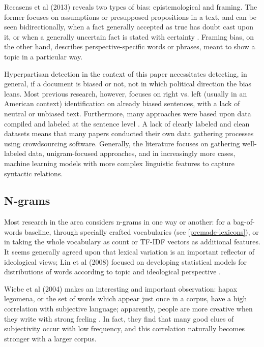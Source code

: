 \documentclass[11pt, a4paper]{article}
\begin{document}
Recasens et al (2013) reveals two types of bias: epistemological and framing. The former focuses on assumptions or presupposed propositions in a text, and can be seen bidirectionally, when a fact generally accepted as true has doubt cast upon it, or when a generally uncertain fact is stated with certainty \cite{recasens2013linguistic}. Framing bias, on the other hand, describes perspective-specific words or phrases, meant to show a topic in a particular way.

Hyperpartisan detection in the context of this paper necessitates detecting, in general, if a document is biased or not, not in which political direction the bias leans. Most previous research, however, focuses on right vs. left (usually in an American context) identification on already biased sentences, with a lack of neutral or unbiased text. Furthermore, many approaches were based upon data compiled and labeled at the sentence level \cite{conrad2012recognizing} \cite{somasundaran2010recognizing}. A lack of clearly labeled and clean datasets means that many papers conducted their own data gathering processes using crowdsourcing software. Generally, the literature focuses on gathering well-labeled data, unigram-focused approaches, and in increasingly more cases, machine learning models with more complex linguistic features to capture syntactic relations.

\subsection{N-grams} \label{ngrams}

Most research in the area considers n-grams in one way or another: for a bag-of-words baseline, through specially crafted vocabularies (see \ref{premade-lexicons}), or in taking the whole vocabulary as count or TF-IDF vectors as additional features. It seems generally agreed upon that lexical variation is an important reflector of ideological views; Lin et al (2008) focused on developing statistical models for distributions of words according to topic and ideological perspective \cite{lin2008jointtopic}.

Wiebe et al (2004) makes an interesting and important observation: hapax legomena, or the set of words which appear just once in a corpus, have a high correlation with subjective language; apparently, people are more creative when they write with strong feeling \cite{wiebe2004learning}. In fact, they find that many good clues of subjectivity occur with low frequency, and this correlation naturally becomes stronger with a larger corpus.
\end{document}

